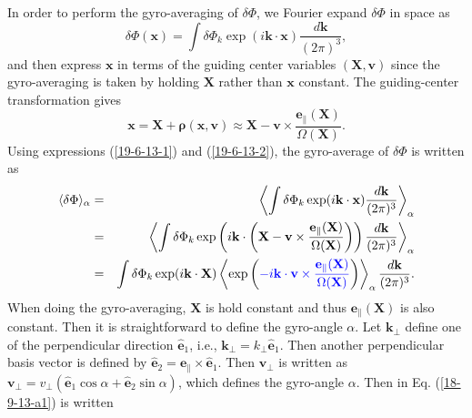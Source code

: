 \documentclass{llncs}
\newcommand{\tmcolor}[2]{{\color{#1}{#2}}}
\newcommand{\tmmathbf}[1]{\ensuremath{\boldsymbol{#1}}}
\begin{document}
In order to perform the gyro-averaging of $\delta \Phi$, we Fourier expand
$\delta \Phi$ in space as
\begin{equation}
  \label{19-6-13-1} \delta \Phi (\mathbf{x}) = \int \delta \Phi_k \exp
  (i\mathbf{k} \cdot \mathbf{x}) \frac{d\mathbf{k}}{(2 \pi)^3},
\end{equation}
and then express $\mathbf{x}$ in terms of the guiding center variables
$(\mathbf{X}, \mathbf{v})$ since the gyro-averaging is taken by holding
$\mathbf{X}$ rather than $\mathbf{x}$ constant. The guiding-center
transformation gives
\begin{equation}
  \label{19-6-13-2} \mathbf{x}=\mathbf{X}+\tmmathbf{\rho} (\mathbf{x},
  \mathbf{v}) \approx \mathbf{X}-\mathbf{v} \times
  \frac{\mathbf{e}_{\parallel} (\mathbf{X})}{\Omega (\mathbf{X})} .
\end{equation}
Using expressions (\ref{19-6-13-1}) and (\ref{19-6-13-2}), the gyro-average of
$\delta \Phi$ is written as
\begin{eqnarray}
  \langle \delta \Phi \rangle_{\alpha} & = & \left\langle \int \delta \Phi_k
  \exp (i\mathbf{k} \cdot \mathbf{x}) \frac{d\mathbf{k}}{(2 \pi)^3}
  \right\rangle_{\alpha} \nonumber\\
  & = & \left\langle \int \delta \Phi_k \exp \left( i\mathbf{k} \cdot \left(
  \mathbf{X}-\mathbf{v} \times \frac{\mathbf{e}_{\parallel}
  (\mathbf{X})}{\Omega (\mathbf{X})} \right) \right) \frac{d\mathbf{k}}{(2
  \pi)^3} \right\rangle_{\alpha} \nonumber\\
  & = & \int \delta \Phi_k \exp (i\mathbf{k} \cdot \mathbf{X}) \left\langle
  \exp \left( \tmcolor{blue}{- i\mathbf{k} \cdot \mathbf{v} \times
  \frac{\mathbf{e}_{\parallel} (\mathbf{X})}{\Omega (\mathbf{X})}} \right)
  \right\rangle_{\alpha} \frac{d\mathbf{k}}{(2 \pi)^3} .  \label{18-9-13-a1}
\end{eqnarray}
When doing the gyro-averaging, $\mathbf{X}$ is hold constant and thus
$\mathbf{e}_{\parallel} (\mathbf{X})$ is also constant. Then it is
straightforward to define the gyro-angle $\alpha$. Let $\mathbf{k}_{\perp}$
define one of the perpendicular direction $\hat{\mathbf{e}}_1$, i.e.,
$\mathbf{k}_{\perp} = k_{\perp} \hat{\mathbf{e}}_1$. Then another
perpendicular basis vector is defined by $\hat{\mathbf{e}}_2
=\mathbf{e}_{\parallel} \times \hat{\mathbf{e}}_1$. Then $\mathbf{v}_{\perp}$
is written as $\mathbf{v}_{\perp} = v_{\perp} (\hat{\mathbf{e}}_1 \cos \alpha
+ \hat{\mathbf{e}}_2 \sin \alpha)$, which defines the gyro-angle $\alpha$.
Then \tmcolor{blue}{the blue expression} in Eq. (\ref{18-9-13-a1}) is written
\end{document}
